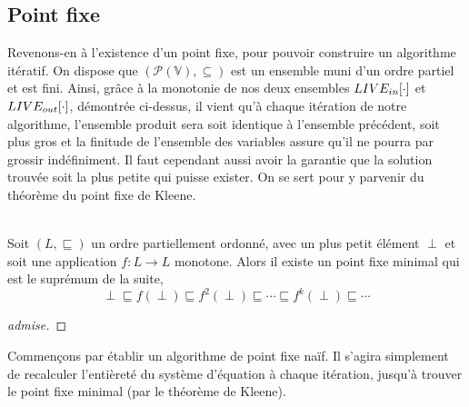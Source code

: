\documentclass[a4paper, 10pt]{article}
\begin{document}
\subsection{Point fixe}
Revenons-en à l'existence d'un point fixe, pour pouvoir construire un algorithme itératif. On dispose que 
$(\mathcal{P}(\mathbb{V}), \subseteq)$ est un ensemble muni d'un ordre partiel et est fini.
Ainsi, grâce à la monotonie de nos deux ensembles $LIVE_{in}[\cdot]$ et $LIVE_{out}[\cdot]$, démontrée ci-dessus, il
vient qu'à chaque itération de notre algorithme, l'ensemble produit sera soit identique à l'ensemble précédent,
soit plus gros et la finitude de l'ensemble des variables assure qu'il ne pourra par grossir indéfiniment. 
Il faut cependant aussi avoir la garantie que la solution trouvée soit la plus petite qui puisse exister.
On se sert pour y parvenir du théorème du point fixe de Kleene.
\\
\\
\begin{theorem}
	Soit $(L, \sqsubseteq)$ un ordre partiellement ordonné, avec un plus petit élément  $\perp$ et soit
	une application $f : L \longrightarrow L$ monotone. Alors il existe un point fixe minimal qui est le suprémum de la suite,
	\[\perp \sqsubseteq f(\perp) \sqsubseteq f^2(\perp) \sqsubseteq \cdots \sqsubseteq f^k(\perp) \sqsubseteq \cdots\]
\end{theorem}
\begin{proof}
	[admise]
\end{proof}
Commençons par établir un algorithme de point fixe naïf. Il s'agira simplement de recalculer l'entièreté du système
d'équation à chaque itération, jusqu'à trouver le point fixe minimal (par le théorème de Kleene).
\end{document}
